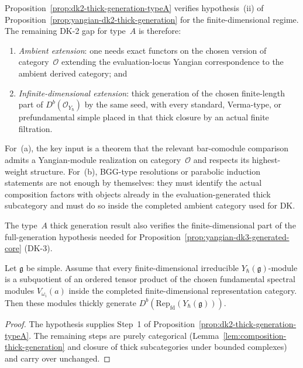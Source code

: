 \begin{remark}
\label{rem:dk2-thick-generation-consequence}
Proposition~\ref{prop:dk2-thick-generation-typeA} verifies
hypothesis~(ii) of Proposition~\ref{prop:yangian-dk2-thick-generation}
for the finite-dimensional regime. The remaining DK-2 gap for
type~$A$ is therefore:
\begin{enumerate}[label=\textup{(\alph*)}]
\item \emph{Ambient extension}: one needs exact functors on the chosen
 version of category~$\mathcal{O}$ extending the evaluation-locus
 Yangian correspondence to the ambient derived category; and
\item \emph{Infinite-dimensional extension}: thick generation of
 the chosen finite-length part of
 $D^b(\mathcal{O}_{Y_\hbar})$ by the same seed, with every
 standard, Verma-type, or prefundamental simple placed in that
 thick closure by an actual finite filtration.
\end{enumerate}
For~(a), the key input is a theorem that the relevant
bar-comodule comparison admits a Yangian-module realization on
category~$\mathcal{O}$ and respects its highest-weight structure.
For~(b), BGG-type resolutions or parabolic induction statements are
not enough by themselves: they must identify the actual composition
factors with objects already in the evaluation-generated thick
subcategory and must do so inside the completed ambient category used
for DK.

The type~$A$ thick generation result also
verifies the finite-dimensional part of the full-generation
hypothesis needed for
Proposition~\ref{prop:yangian-dk3-generated-core} \textup{(}DK-3\textup{)}.
\end{remark}

\begin{corollary}
\label{cor:dk2-thick-generation-all-types}%
%
Let $\mathfrak g$ be simple. Assume that every finite-dimensional
irreducible $Y_\hbar(\mathfrak g)$-module is a subquotient of an
ordered tensor product of the chosen fundamental spectral modules
$V_{\omega_i}(a)$ inside the completed finite-dimensional
representation category. Then these modules thickly generate\/
$D^b(\mathrm{Rep}_{\mathrm{fd}}(Y_\hbar(\mathfrak{g})))$.
\end{corollary}

\begin{proof}
The hypothesis supplies Step~1 of
Proposition~\ref{prop:dk2-thick-generation-typeA}. The remaining
steps are purely categorical
\textup{(}Lemma~\ref{lem:composition-thick-generation}
and closure of thick subcategories under bounded complexes\textup{)}
and carry over unchanged.
\end{proof}

